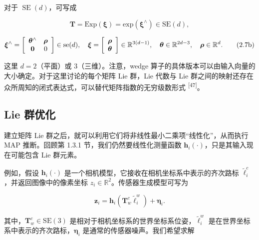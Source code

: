 对于 $\operatorname{SE}(d)$，可写成

\begin{equation}
\boldsymbol {T} = \mathrm{Exp} (\boldsymbol {\xi}) = \mathrm{exp} (\boldsymbol {\xi} ^ {\wedge}) \in \mathrm{SE} (d),\tag{2.7a}
\end{equation}

\begin{equation}
\boldsymbol {\xi} ^ {\wedge} = \left[ \begin{array}{c c} \boldsymbol {\theta} ^ {\wedge} & \boldsymbol {\rho} \\ \mathbf {0} & 0 \end{array} \right] \in \operatorname{se} (d), \quad \boldsymbol {\xi} = \left[ \begin{array}{c} \boldsymbol {\rho} \\ \boldsymbol {\theta} \end{array} \right] \in \mathbb {R} ^ {3 (d - 1)}, \quad \boldsymbol {\theta} \in \mathbb {R} ^ {2 d - 3}, \quad \boldsymbol {\rho} \in \mathbb {R} ^ {d}.\tag{2.7b}
\end{equation}

这里 $d=2$（平面）或 $3$（三维）。注意，wedge 算子的具体版本可以由输入向量的大小确定。对于这里讨论的每个矩阵 Lie 群，Lie 代数与 Lie 群之间的映射还存在众所周知的闭式表达式，可以替代矩阵指数的无穷级数形式 \textsuperscript{[47]}。

\subsection{Lie 群优化}

建立矩阵 Lie 群之后，就可以利用它们将非线性最小二乘项“线性化”，从而执行 MAP 推断。回顾第 1.3.1 节，我们仍然要线性化测量函数 $\pmb h_i(\cdot)$，只是其输入现在可能包含 Lie 群元素。

例如，假设 $\pmb h_i(\cdot)$ 是一个相机模型，它接收在相机坐标系中表示的齐次路标 $\tilde\ell_i^c$，并返回图像中的像素坐标 $z_i\in\mathbb{R}^2$。传感器生成模型可写为

\begin{equation}
\boldsymbol {z} _ {i} = \boldsymbol {h} _ {i} \left(\boldsymbol {T} _ {w} ^ {c} \tilde {\ell} _ {i} ^ {w}\right) + \boldsymbol {\eta} _ {i}.\tag{2.8}
\end{equation}

其中，$\pmb T_w^c\in\mathrm{SE}(3)$ 是相对于相机坐标系的世界坐标系位姿，$\tilde\ell_i^w$ 是在世界坐标系中表示的齐次路标，$\pmb\eta_i$ 是通常的传感器噪声。我们希望求解

